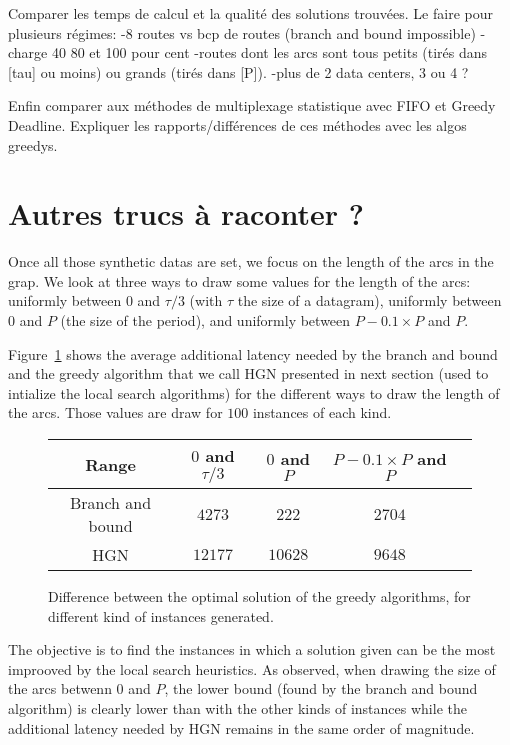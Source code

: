 Comparer les temps de calcul et la qualité des solutions trouvées. 
Le faire pour plusieurs régimes:
-8 routes vs bcp de routes (branch and bound impossible)
-charge 40 80 et 100 pour cent
-routes dont les arcs sont tous petits (tirés dans [tau] ou moins) ou grands (tirés dans [P]).
-plus de 2 data centers, 3 ou 4 ?

Enfin comparer aux méthodes de multiplexage statistique avec FIFO et Greedy Deadline.
Expliquer les rapports/différences de ces méthodes avec les algos greedys.



\section{Autres trucs à raconter ?}
Once all those synthetic datas are set, we focus on the length of the arcs in the grap. We look at three ways to draw some values for the length of the arcs: uniformly between $0$ and $\tau/3$ (with $\tau$ the size of a datagram), uniformly between $0$ and $P$ (the size of the period), and uniformly between $P-0.1\times P$ and $P$.

Figure~\ref{tab:instances} shows the average additional latency needed by the branch and bound and the greedy algorithm that we call HGN presented in next section (used to intialize the local search algorithms) for the different ways to draw the length of the arcs. Those values are draw for $100$ instances of each kind.

\begin{center}
\begin{figure}
\centering
\begin{tabular}{ |c|c|c|c|c| }
\hline
    Range & $0$ and $\tau/3$ & $0$ and $P$& $P-0.1\times P$ and $P$\\
    \hline
    Branch and bound & $4273$ & $222$& $2704$ \\
 
    HGN & $12177$ & $10628$& $9648$\\
   
    \hline
  
 \end{tabular} 
 \caption{Difference between the optimal solution of the greedy algorithms, for different kind of instances generated.}
 \label{tab:instances}
 \end{figure}
 \end{center}
 The objective is to find the instances in which a solution given can be the most improoved by the local search heuristics. As observed, when drawing the size of the arcs betwenn $0$ and $P$, the lower bound (found by the branch and bound algorithm) is clearly lower than with the other kinds of instances while the additional latency needed by HGN remains in the same order of magnitude.
 